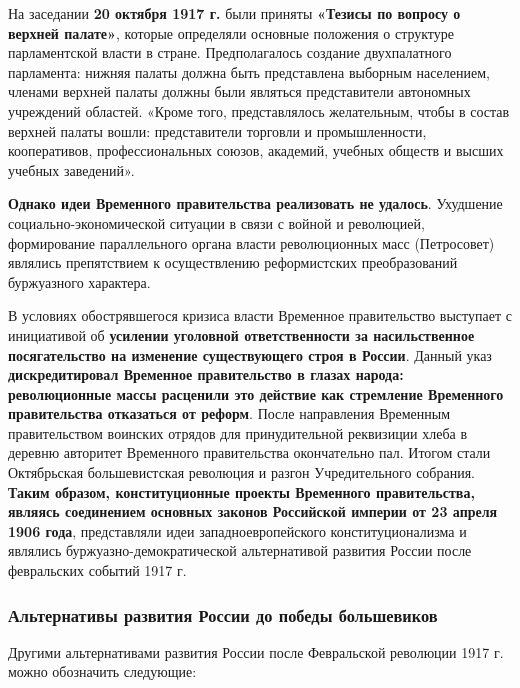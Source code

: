 \documentclass{article}
\begin{document}
На заседании \textbf{20 октября 1917 г.} были приняты \textbf{«Тезисы по вопросу о верхней палате»}, которые определяли основные положения о структуре парламентской власти в стране. Предполагалось создание двухпалатного парламента: нижняя палаты должна быть представлена выборным населением, членами верхней палаты должны были являться представители автономных учреждений областей. «Кроме того, представлялось желательным, чтобы в состав верхней палаты вошли: представители торговли и промышленности, кооперативов, профессиональных союзов, академий, учебных обществ и высших учебных заведений».

\hfill

\textbf{Однако идеи Временного правительства реализовать не удалось}. Ухудшение социально-экономической ситуации в связи с войной и революцией, формирование параллельного органа власти революционных масс (Петросовет) являлись препятствием к осуществлению реформистских преобразований буржуазного характера.

\hfill

В условиях обострявшегося кризиса власти Временное правительство выступает с инициативой об \textbf{усилении уголовной ответственности за насильственное посягательство на изменение существующего строя в России}. Данный указ \textbf{дискредитировал Временное правительство в глазах народа: революционные массы расценили это действие как стремление Временного правительства отказаться от реформ}. После направления Временным правительством воинских отрядов для принудительной реквизиции хлеба в деревню авторитет Временного правительства окончательно пал. Итогом стали Октябрьская большевистская революция и разгон Учредительного собрания. \textbf{Таким образом, конституционные проекты Временного правительства, являясь соединением основных законов Российской империи от 23 апреля 1906 года}, представляли идеи западноевропейского конституционализма и являлись буржуазно-демократической альтернативой развития России после февральских событий 1917 г.

\subsubsection{Альтернативы развития России до победы большевиков}

Другими альтернативами развития России после Февральской революции 1917 г. можно обозначить следующие:
\end{document}
